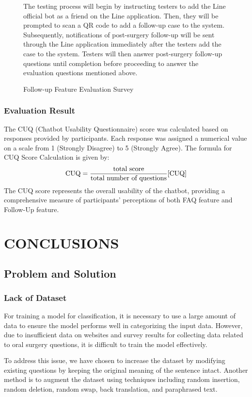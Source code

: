 \documentclass[12pt,oneside,openright,a4paper]{cpe-english-project}
\begin{document}
\begin{figure}[H]
\begin{minipage}{0.3\textwidth}
          \end{minipage}
          \caption{Follow-up Feature Evaluation Survey}\label{fig:followupform}
            \begin{justify}
              \qquad The testing process will begin by instructing testers to add the Line official bot as a friend on the Line application. Then, they will be prompted to scan a QR code to add a follow-up case to the system. Subsequently, notifications of post-surgery follow-up will be sent through the Line application immediately after the testers add the case to the system. Testers will then answer post-surgery follow-up questions until completion before proceeding to answer the evaluation questions mentioned above.\par            
            \end{justify}
        \end{figure}
      \subsection{Evaluation Result}
        \qquad The CUQ (Chatbot Usability Questionnaire) score was calculated based on responses provided by participants. Each response was assigned a numerical value on a scale from 1 (Strongly Disagree) to 5 (Strongly Agree). The formula for CUQ Score Calculation is given by:
        \[
        \text{CUQ} = \frac{\text{total score}}{\text{total number of questions}}\cite{CUQ}
        \]
        \qquad The CUQ score represents the overall usability of the chatbot, providing a comprehensive measure of participants' perceptions of both FAQ feature and Follow-Up feature.\par
    
    \chapter{CONCLUSIONS}
      \section{Problem and Solution}
        \subsection{Lack of Dataset}
          \qquad For training a model for classification, it is necessary to use a large amount of data to ensure the model performs well in categorizing the input data. However, due to insufficient data on websites and survey results for collecting data related to oral surgery questions, it is difficult to train the model effectively. \par
          \qquad To address this issue, we have chosen to increase the dataset by modifying existing questions by keeping the original meaning of the sentence intact. Another method is to augment the dataset using techniques including random insertion, random deletion, random swap, back translation, and paraphrased text. \par
\end{document}
